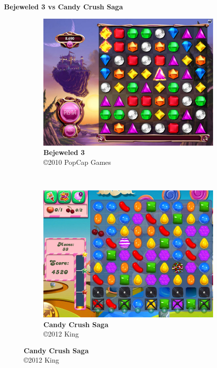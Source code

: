 \expandafter\documentclass\expandafter[table, usenames, svgnames, dvipsnames, \classopts]{beamer}
\begin{document}
\begin{frame}{\textbf{Bejeweled 3 vs Candy Crush Saga}}

	\begin{figure}
	    \centering

	    \begin{subfigure}[!h]{0.4\paperwidth}
	    	\centering
	    	\includegraphics[height=0.4\paperheight]{bejeweled-screenshot}
	        \caption{\scriptsize\textbf{Bejeweled 3}\\\copyright{2010} PopCap Games\footnotemark{}}
	    \end{subfigure}
	    ~
		\begin{subfigure}[!h]{0.4\paperwidth}
			\centering
	        \includegraphics[height=0.4\paperheight]{candy-crush-screenshot}
	        \caption{\scriptsize\textbf{Candy Crush Saga}\\\copyright{2012} King\footnotemark{}}
	    \end{subfigure}
    \end{figure}


\end{frame}
\end{document}
